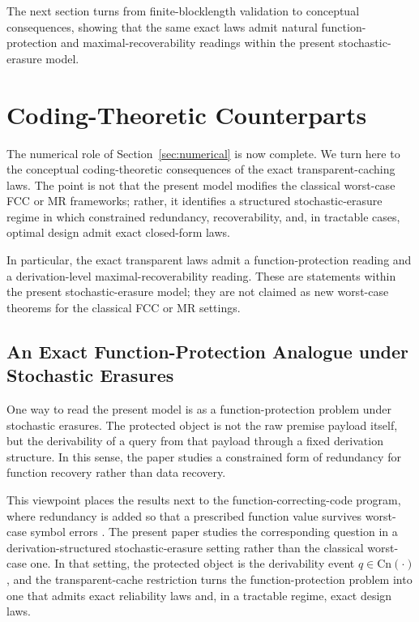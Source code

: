 \documentclass[journal]{IEEEtran}
\newcommand{\Cn}{\text{Cn}}
\numberwithin{equation}{section}
\begin{document}
The next section turns from finite-blocklength validation to conceptual
consequences, showing that the same exact laws admit natural
function-protection and maximal-recoverability readings within the present
stochastic-erasure model.

\section{Coding-Theoretic Counterparts}
\label{sec:coding-theoretic}

The numerical role of Section~\ref{sec:numerical} is now complete.  We turn
here to the conceptual coding-theoretic consequences of the exact
transparent-caching laws.  The point is not that the present model modifies
the classical worst-case FCC or MR frameworks; rather, it identifies a
structured stochastic-erasure regime in which constrained redundancy,
recoverability, and, in tractable cases, optimal design admit exact
closed-form laws.

In particular, the exact transparent laws admit a function-protection
reading and a derivation-level maximal-recoverability reading.  These are
statements within the present stochastic-erasure model; they are not claimed
as new worst-case theorems for the classical FCC or MR settings.

\subsection{An Exact Function-Protection Analogue under Stochastic Erasures}
\label{subsec:fcc-counterpart}

One way to read the present model is as a function-protection problem under
stochastic erasures.  The protected object is not the raw premise payload
itself, but the derivability of a query from that payload through a fixed
derivation structure.  In this sense, the paper studies a constrained form
of redundancy for function recovery rather than data recovery.

This viewpoint places the results next to the function-correcting-code
program, where redundancy is added so that a prescribed function value
survives worst-case symbol errors
\cite{lenz2023function,rajput2026function}.  The present paper studies the
corresponding question in a derivation-structured stochastic-erasure
setting rather than the classical worst-case one.  In that setting, the
protected object is the derivability event \(q\in\Cn(\cdot)\), and the
transparent-cache restriction turns the function-protection problem into
one that admits exact reliability laws and, in a tractable regime, exact
design laws.
\end{document}
